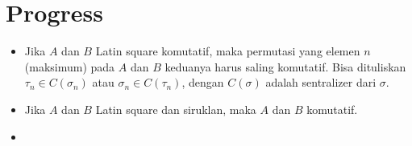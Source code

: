 \documentclass[aspectratio=169]{beamer}
\theoremstyle{definition}
\numberwithin{definisi}{subsection}
\begin{document}
\section{Progress}
\begin{frame}{\insertsection}
  \begin{itemize}
    \item Jika $A$ dan $B$ Latin square komutatif, maka permutasi yang elemen $n$ (maksimum) pada $A$ dan $B$ keduanya harus saling komutatif. Bisa dituliskan $\tau_n \in C(\sigma_n)$ atau $\sigma_n \in C(\tau_n)$, dengan $C(\sigma)$ adalah sentralizer dari $\sigma$.
    \item Jika $A$ dan $B$ Latin square dan siruklan, maka $A$ dan $B$ komutatif.
    \item
  \end{itemize}
\end{frame}
\end{document}
